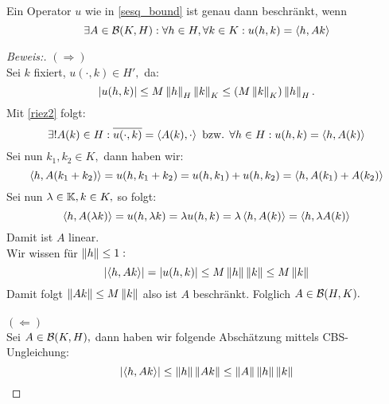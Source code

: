 \begin{theorem}
Ein Operator $u$ wie in \ref{sesq_bound} ist genau dann beschränkt, wenn \[\exists A \in \mathcal{B}(K, H): \forall h \in H, \forall k \in K: u(h, k) = \left\langle h, Ak\right\rangle\]

\begin{proof}[Beweis:] $(\Longrightarrow)$ \\
Sei $k$ fixiert, $u(\cdot, k) \in H',$ da:
\[\left\lvert u(h, k) \right\rvert \leq M \left\lVert h\right\rVert_H \left\lVert k\right\rVert_K \leq (M \left\lVert k\right\rVert_K)\left\lVert h\right\rVert_H.\] Mit \ref{riez2} folgt:
\[\exists!A(k) \in H: \overline{u(\cdot, k)} = \left\langle A(k), \cdot\right\rangle \text{ bzw. } \forall h \in H: u(h, k) = \left\langle h, A(k)\right\rangle\]
Sei nun $k_1, k_2 \in K,$ dann haben wir:
\[\left\langle h, A(k_1 + k_2)\right\rangle = u(h, k_1 + k_2) = u(h, k_1)+u(h, k_2) = \left\langle h, A(k_1) + A(k_2)\right\rangle\] Sei nun $\lambda \in \mathbb{K}, k \in K,$ so folgt: \[\left\langle h, A(\lambda k)\right\rangle = u(h, \lambda k)= \lambda u(h, k) = \lambda \left\langle h, A(k)\right\rangle = \left\langle h, \lambda A(k)\right\rangle\] Damit ist $A$ linear.\\ 
Wir wissen für $\left\lVert h\right\rVert \leq 1:$ \[\left\lvert \left\langle h, Ak\right\rangle \right\rvert = \left\lvert u(h, k) \right\rvert \leq M \left\lVert h\right\rVert\left\lVert k\right\rVert \leq M\left\lVert k\right\rVert\] Damit folgt $\left\lVert Ak\right\rVert \leq M \left\lVert k\right\rVert$ also ist $A$ beschränkt. Folglich $A \in \mathcal{B}(H, K).$ \\
\\
$(\Longleftarrow)$ \\
Sei $A \in \mathcal{B}(K, H),$ dann haben wir folgende Abschätzung mittels CBS-Ungleichung: \[\left\lvert \left\langle h, Ak\right\rangle \right\rvert \leq \left\lVert h\right\rVert\left\lVert Ak\right\rVert \leq \left\lVert A\right\rVert\left\lVert h\right\rVert\left\lVert k\right\rVert\]
\end{proof}
\end{theorem}



